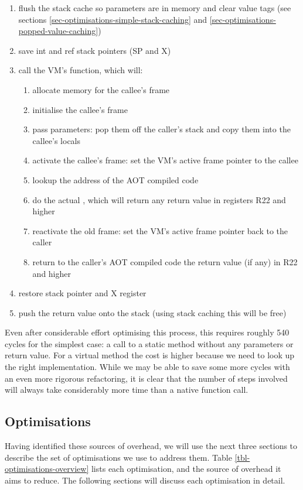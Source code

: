 \begin{enumerate}
  \small
  \item flush the stack cache so parameters are in memory and clear value tags (see sections \ref{sec-optimisations-simple-stack-caching} and \ref{sec-optimisations-popped-value-caching})
  \item save int and ref stack pointers (SP and X)
  \item call the VM's  function, which will:
  \begin{enumerate}
    \item allocate memory for the callee's frame
    \item initialise the callee's frame
    \item pass parameters: pop them off the caller's stack and copy them into the callee's locals
    \item activate the callee's frame: set the VM's active frame pointer to the callee
    \item lookup the address of the AOT compiled code
    \item do the actual , which will return any return value in registers R22 and higher
    \item reactivate the old frame: set the VM's active frame pointer back to the caller
    \item return to the caller's AOT compiled code the return value (if any) in R22 and higher
  \end{enumerate}
  \item restore stack pointer and X register
  \item push the return value onto the stack (using stack caching this will be free)
\end{enumerate}

Even after considerable effort optimising this process, this requires roughly 540 cycles for the simplest case: a call to a static method without any parameters or return value. For a virtual method the cost is higher because we need to look up the right implementation. While we may be able to save some more cycles with an even more rigorous refactoring, it is clear that the number of steps involved will always take considerably more time than a native function call.

\subsection{Optimisations}
\label{sec-optimisations-java-source}
Having identified these sources of overhead, we will use the next three sections to describe the set of optimisations we use to address them. Table \ref{tbl-optimisations-overview} lists each optimisation, and the source of overhead it aims to reduce. The following sections will discuss each optimisation in detail.


